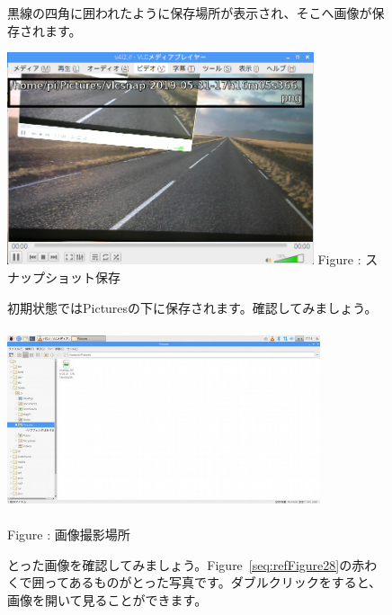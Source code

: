\documentclass[a4paper,12pt]{jarticle}
\begin{document}
\begin{figure}
  黒線の四角に囲われたように保存場所が表示され、そこへ画像が保存されます。

  \centering
  \begin{minipage}{9.206cm}
    \includegraphics[width=9.017cm,height=6.248cm]{textbook-img120.png}
    Figure : スナップショット保存
  \end{minipage}



  \bigskip
  \flushleft

  初期状態ではPicturesの下に保存されます。確認してみましょう。



  \centering
  \begin{minipage}{9.345cm}
    \includegraphics[width=9.22cm,height=5.306cm]{textbook-img121.jpg}

    Figure : 画像撮影場所
  \end{minipage}


  \bigskip

  \flushleft
  とった画像を確認してみましょう。Figure~\ref{seq:refFigure28}の赤わくで囲ってあるものがとった写真です。ダブルクリックをすると、画像を開いて見ることができます。




\end{figure}
\end{document}
